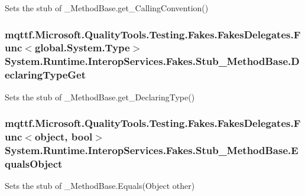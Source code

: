 Sets the stub of \-\_\-\-Method\-Base.\-get\-\_\-\-Calling\-Convention()

\hypertarget{class_system_1_1_runtime_1_1_interop_services_1_1_fakes_1_1_stub___method_base_a642414305d93420abcbcef1bb1f1545e}{
\subsubsection[{Declaring\-Type\-Get}]{\setlength{\rightskip}{0pt plus 5cm}mqttf.\-Microsoft.\-Quality\-Tools.\-Testing.\-Fakes.\-Fakes\-Delegates.\-Func$<$global.\-System.\-Type$>$ System.\-Runtime.\-Interop\-Services.\-Fakes.\-Stub\-\_\-\-Method\-Base.\-Declaring\-Type\-Get}}\label{class_system_1_1_runtime_1_1_interop_services_1_1_fakes_1_1_stub___method_base_a642414305d93420abcbcef1bb1f1545e}


Sets the stub of \-\_\-\-Method\-Base.\-get\-\_\-\-Declaring\-Type()

\hypertarget{class_system_1_1_runtime_1_1_interop_services_1_1_fakes_1_1_stub___method_base_a7d64de013b624f1dc6d45e7190027771}{
\subsubsection[{Equals\-Object}]{\setlength{\rightskip}{0pt plus 5cm}mqttf.\-Microsoft.\-Quality\-Tools.\-Testing.\-Fakes.\-Fakes\-Delegates.\-Func$<$object, bool$>$ System.\-Runtime.\-Interop\-Services.\-Fakes.\-Stub\-\_\-\-Method\-Base.\-Equals\-Object}}\label{class_system_1_1_runtime_1_1_interop_services_1_1_fakes_1_1_stub___method_base_a7d64de013b624f1dc6d45e7190027771}


Sets the stub of \-\_\-\-Method\-Base.\-Equals(\-Object other)

